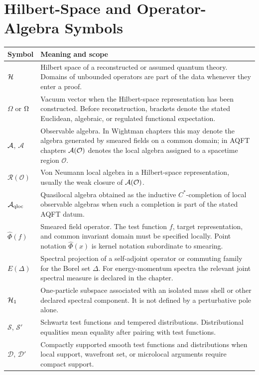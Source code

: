 \section*{Hilbert-Space and Operator-Algebra Symbols}

\begin{longtable}{>{\raggedright\arraybackslash}p{}
                  >{\raggedright\arraybackslash}p{}}
\hline
\textbf{Symbol} & \textbf{Meaning and scope}\\
\hline
\endhead
\(\mathcal H\) &
Hilbert space of a reconstructed or assumed quantum theory.  Domains of
unbounded operators are part of the data whenever they enter a proof.\\
\(\Omega\) or \(\Omega\) &
Vacuum vector when the Hilbert-space representation has been constructed.
Before reconstruction, brackets denote the stated Euclidean, algebraic, or
regulated functional expectation.\\
\(\mathcal A\), \(\mathcal A\) &
Observable algebra.  In Wightman chapters this may denote the algebra
generated by smeared fields on a common domain; in AQFT chapters
\(\mathcal A(\mathcal O)\) denotes the local algebra assigned to a spacetime
region \(\mathcal O\).\\
\(\mathcal R(\mathcal O)\) &
Von Neumann local algebra in a Hilbert-space representation, usually the
weak closure of \(\mathcal A(\mathcal O)\).\\
\(\mathcal A_{\rm qloc}\) &
Quasilocal algebra obtained as the inductive \(C^*\)-completion of local
observable algebras when such a completion is part of the stated AQFT datum.\\
\(\widehat\Phi(f)\) &
Smeared field operator.  The test function \(f\), target representation, and
common invariant domain must be specified locally.  Point notation
\(\widehat\Phi(x)\) is kernel notation subordinate to smearing.\\
\(E(\Delta)\) &
Spectral projection of a self-adjoint operator or commuting family for the
Borel set \(\Delta\).  For energy-momentum spectra the relevant joint
spectral measure is declared in the chapter.\\
\(\mathcal H_1\) &
One-particle subspace associated with an isolated mass shell or other
declared spectral component.  It is not defined by a perturbative pole alone.\\
\(\mathcal S\), \(\mathcal S'\) &
Schwartz test functions and tempered distributions.  Distributional
equalities mean equality after pairing with test functions.\\
\(\mathcal D\), \(\mathcal D'\) &
Compactly supported smooth test functions and distributions when local
support, wavefront set, or microlocal arguments require compact support.\\
\hline
\end{longtable}

